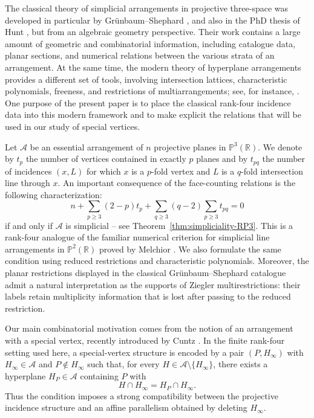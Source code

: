\documentclass[11pt]{article}
\theoremstyle{definition}
\theoremstyle{remark}
\newcommand{\PP}{\mathbb P}
\newcommand{\RR}{\mathbb R}
\newcommand{\cA}{\mathcal A}
\begin{document}
The classical theory of simplicial arrangements in projective three-space
was developed in particular by Gr\"unbaum--Shephard
\cite{GrunbaumShephard}, and also in the PhD thesis of Hunt \cite{Hunt}, but from an algebraic geometry perspective.
Their work contains a large
amount of geometric and combinatorial information, including catalogue
data, planar sections, and numerical relations between the various strata
of an arrangement.  At the same time, the modern theory of hyperplane
arrangements provides a different set of tools, involving intersection
lattices, characteristic polynomials, freeness, and restrictions of
multiarrangements; see, for instance, \cite{DimcaBook,OrlikTerao}.  One
purpose of the present paper is to place the classical rank-four incidence
data into this modern framework and to make explicit the relations that will be
used in our study of special vertices.

Let $\cA$ be an essential arrangement of $n$ projective planes in
$\PP^3(\RR)$.  We denote by $t_p$ the number of vertices contained in
exactly $p$ planes and by $t_{pq}$ the number of incidences $(x,L)$ for
which $x$ is a $p$-fold vertex and $L$ is a $q$-fold intersection line
through $x$.  An important consequence of the face-counting relations is
the following characterization:
\[
 n+\sum_{p\geq 3}(2-p)t_p+
 \sum_{q\geq 3}(q-2)\sum_{p\geq 3}t_{pq}=0
\]
if and only if $\cA$ is simplicial -- see
Theorem~\ref{thm:simpliciality-RP3}.  This is a rank-four analogue of the
familiar numerical criterion for simplicial line arrangements in
$\PP^2(\RR)$ proved by Melchior \cite{Melchior}.  We also formulate the same condition using reduced
restrictions and characteristic polynomials.  Moreover, the planar
restrictions displayed in the classical Gr\"unbaum--Shephard catalogue
admit a natural interpretation as the supports of Ziegler
multirestrictions: their labels retain multiplicity information that is
lost after passing to the reduced restriction.

Our main combinatorial motivation comes from the notion of an arrangement with a special
vertex, recently introduced by Cuntz \cite{Cuntz}.  In the
finite rank-four setting used here, a special-vertex structure is encoded
by a pair $(P,H_\infty)$ with $H_\infty\in\cA$ and $P\notin H_\infty$
such that, for every $H\in\cA\setminus\{H_\infty\}$, there exists a
hyperplane $H_P\in\cA$ containing $P$ with
\[
H\cap H_\infty=H_P\cap H_\infty.
\]
Thus the condition imposes a strong compatibility between the projective
incidence structure and an affine parallelism obtained by deleting
$H_\infty$.
\end{document}

